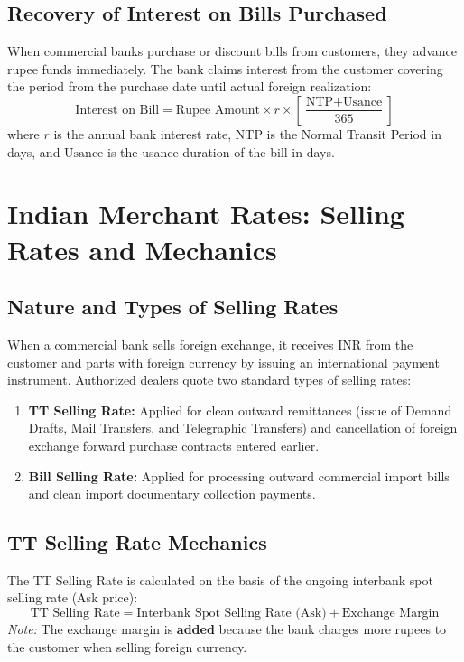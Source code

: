 \subsection{Recovery of Interest on Bills Purchased}
When commercial banks purchase or discount bills from customers, they advance rupee funds immediately. The bank claims interest from the customer covering the period from the purchase date until actual foreign realization:
\begin{equation}
    \text{Interest on Bill} = \text{Rupee Amount} \times r \times \left[ \frac{\text{NTP} + \text{Usance}}{365} \right]
\end{equation}
\noindent where $r$ is the annual bank interest rate, $\text{NTP}$ is the Normal Transit Period in days, and $\text{Usance}$ is the usance duration of the bill in days.

\section{Indian Merchant Rates: Selling Rates and Mechanics}

\subsection{Nature and Types of Selling Rates}
When a commercial bank sells foreign exchange, it receives INR from the customer and parts with foreign currency by issuing an international payment instrument. Authorized dealers quote two standard types of selling rates:
\begin{enumerate}[leftmargin=*]
    \item \textbf{TT Selling Rate:} Applied for clean outward remittances (issue of Demand Drafts, Mail Transfers, and Telegraphic Transfers) and cancellation of foreign exchange forward purchase contracts entered earlier.
    \item \textbf{Bill Selling Rate:} Applied for processing outward commercial import bills and clean import documentary collection payments.
\end{enumerate}

\subsection{TT Selling Rate Mechanics}
The TT Selling Rate is calculated on the basis of the ongoing interbank spot selling rate (Ask price):
\begin{equation}
    \text{TT Selling Rate} = \text{Interbank Spot Selling Rate (Ask)} + \text{Exchange Margin}
\end{equation}
\noindent\textit{Note:} The exchange margin is \textbf{added} because the bank charges more rupees to the customer when selling foreign currency.

